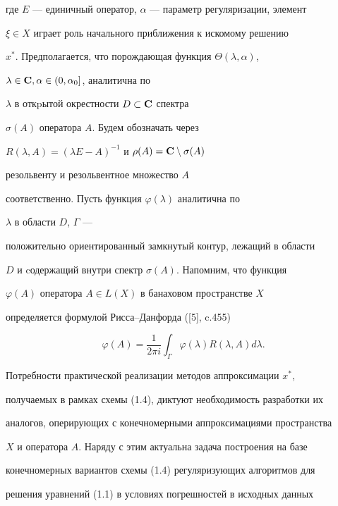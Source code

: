 где $E$ --- единичный оператор, $\alpha$ --- параметр регуляризации, элемент


$\xi \in X$ играет роль начального приближения к искомому решению


$x^{*}$. Предполагается, что порождающая функция $\Theta(\lambda, \alpha)$,


$\lambda \in {\bold C}, \alpha \in (0,\alpha_0]$, аналитична по


$\lambda$ в откpытой окрестности $D \subset {\bold C}$ спектра


$\sigma(A)$ оператора $A$. Будем обозначать через


$R(\lambda,A)={(\lambda E- A)}^{-1}$ и $\rho(A)={\bold C}\setminus\sigma(A)$


резольвенту и резольвентное множество $A$


соответственно. Пусть функция $\varphi(\lambda)$ аналитична по


$\lambda$ в области $D$, $\Gamma$ ---


положительно ориентированный замкнутый контур, лежащий в области


$D$ и cодержащий внутри спектр $\sigma(A)$. Напомним, что функция


$\varphi(A)$ оператора $A \in L(X)$ в банаховом пространстве $X$


определяется формулой Рисса--Данфорда ([5], c.455)


\begin{equation}


\varphi(A)=\frac{1}{2\pi i} \int _{\Gamma}


\varphi(\lambda) R(\lambda,A) d \lambda.


\tag{1.5}


\end{equation}





Потребности практической реализации методов аппроксимации $x^{*}$,


получаемых в рамках схемы (1.4), диктуют необходимость разработки их


аналогов, оперирующих с конечномерными аппроксимациями пространства


$X$ и оператора $A$. Наряду с этим актуальна задача построения на базе


конечномерных вариантов схемы (1.4) регуляризующих алгоритмов для


решения уравнений (1.1) в условиях погрешностей в исходных данных


